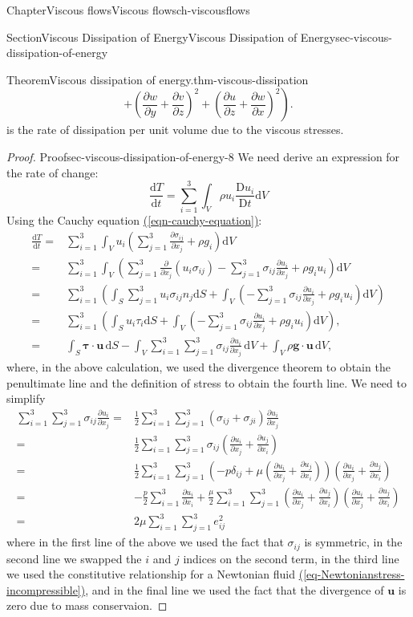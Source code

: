 \documentclass[oneside,10pt,]{book}
\newcommand{\xreffont}{\relax}
\numberwithin{equation}{section}
\newcommand{\de}{\mathrm{d}}
\newcommand{\dd}[2]{\frac{\de#1}{\de#2}}
\newcommand{\DD}[2]{\frac{\mathrm{D}#1}{\mathrm{D}#2}}
\newcommand{\pd}[2]{\frac{\partial#1}{\partial#2}}
\newcommand{\bu}{\boldsymbol{u}}
\newcommand{\bg}{\boldsymbol{g}}
\newcommand{\btau}{\boldsymbol{\tau}}
\begin{document}
\begin{chapterptx}{Chapter}{Viscous flows}{}{Viscous flows}{}{}{ch-viscousflows}
\begin{sectionptx}{Section}{Viscous Dissipation of Energy}{}{Viscous Dissipation of Energy}{}{}{sec-viscous-dissipation-of-energy}
\begin{theorem}{Theorem}{Viscous dissipation of energy.}{}{thm-viscous-dissipation}
\begin{equation*}
\left.+\left(\pd{w}{y}+\pd{v}{z}\right)^2+\left(\pd{u}{z}+\pd{w}{x}\right)^2\right).
\end{equation*}
is the rate of dissipation per unit volume due to the viscous stresses.%
\end{theorem}
\begin{proof}{Proof}{}{sec-viscous-dissipation-of-energy-8}
We need derive an expression for the rate of change:%
\begin{equation*}
\dd{T}{t}=\sum_{i=1}^3\int_V\rho u_i\DD{u_i}{t}\de V
\end{equation*}
Using the Cauchy equation \hyperref[eqn-cauchy-equation]{({\xreffont\ref{eqn-cauchy-equation}})}:%
\begin{align*}
\dd{T}{t}=&\sum_{i=1}^3\int_Vu_i\left(\sum_{j=1}^3\pd{\sigma_{ij}}{x_j}+\rho g_i\right)\de V\\
=&\sum_{i=1}^3\int_V\left(\sum_{j=1}^3\pd{}{x_j}\left(u_i\sigma_{ij}\right)-\sum_{j=1}^3\sigma_{ij}\pd{u_i}{x_j}+\rho g_iu_i\right)\de V\\
=&\sum_{i=1}^3\left(\int_S\sum_{j=1}^3u_i\sigma_{ij}n_j\de S+\int_V\left(-\sum_{j=1}^3\sigma_{ij}\pd{u_i}{x_j}+\rho g_iu_i\right)\de V\right)\\
=&\sum_{i=1}^3\left(\int_Su_i\tau_i\de S+\int_V\left(-\sum_{j=1}^3\sigma_{ij}\pd{u_i}{x_j}+\rho g_iu_i\right)\de V\right),\\
=&\int_S\btau\cdot\bu\,\de S-\int_V\sum_{i=1}^3\sum_{j=1}^3\sigma_{ij}\pd{u_i}{x_j}\,\de V+\int_V\rho\bg\cdot\bu\,\de V,
\end{align*}
where, in the above calculation, we used the divergence theorem to obtain the penultimate line and the definition of stress to obtain the fourth line. We need to simplify%
\begin{align*}
\sum_{i=1}^3\sum_{j=1}^3\sigma_{ij}\pd{u_i}{x_j}
=&\frac12\sum_{i=1}^3\sum_{j=1}^3\left(\sigma_{ij}+\sigma_{ji}\right)\pd{u_i}{x_j}\\
=&\frac12\sum_{i=1}^3\sum_{j=1}^3\sigma_{ij}\left(\pd{u_i}{x_j}+\pd{u_j}{x_i}\right)\\
=&\frac12\sum_{i=1}^3\sum_{j=1}^3\left(-p\delta_{ij}+\mu\left(\pd{u_i}{x_j}+\pd{u_j}{x_i}\right)\right)\left(\pd{u_i}{x_j}+\pd{u_j}{x_i}\right)\\
=&-\frac{p}2\sum_{i=1}^3\pd{u_i}{x_i}+\frac{\mu}2\sum_{i=1}^3\sum_{j=1}^3\left(\pd{u_i}{x_j}+\pd{u_j}{x_i}\right)\left(\pd{u_i}{x_j}+\pd{u_j}{x_i}\right)\\
=&2\mu\sum_{i=1}^3\sum_{j=1}^3e_{ij}^2
\end{align*}
where in the first line of the above we used the fact that \(\sigma_{ij}\) is symmetric, in the second line we swapped the \(i\) and \(j\) indices on the second term, in the third line we used the constitutive relationship for a Newtonian fluid \hyperref[eq-Newtonianstress-incompressible]{({\xreffont\ref{eq-Newtonianstress-incompressible}})}, and in the final line we used the fact that the divergence of \(\bu\) is zero due to mass conservaion.%

\end{proof}
\end{sectionptx}
\end{chapterptx}
\end{document}
